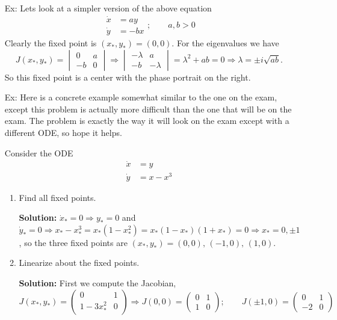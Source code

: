 \documentclass[reqno]{amsart}
\theoremstyle{definition}
\begin{document}
\begin{enumerate}
\begin{figure}[htbp]
\end{figure}
%
\item[Ex:  ]  Lets look at a simpler version of the above equation
%
\begin{equation}
\begin{split}
\dot{x} &= ay\\
\dot{y} &= -bx
\end{split};\qquad a,b > 0
\end{equation}
%
Clearly the fixed point is $(x_*,y_*) = (0,0)$.  For the eigenvalues we have
%
\begin{equation*}
J(x_*,y_*) = \begin{vmatrix}
0 & a\\
-b & 0
\end{vmatrix} \Rightarrow \begin{vmatrix}
- \lambda & a\\
-b & - \lambda
\end{vmatrix} = \lambda^2 + ab = 0 \Rightarrow \lambda = \pm i\sqrt{ab}.
\end{equation*}
%
So this fixed point is a center with the phase portrait on the right.

\item[Ex:  ]  Here is a concrete example somewhat similar to the one on the exam, except
this problem is actually more difficult than the one that will be on the exam.  The problem
is exactly the way it will look on the exam except with a different ODE, so hope it helps.

Consider the ODE
%
\begin{equation}
\begin{split}
\dot{x} &= y\\
\dot{y} &= x - x^3
\end{split}
\end{equation}

\begin{enumerate}

\item  Find all fixed points.

\textbf{Solution:  }  $\dot{x}_* = 0 \Rightarrow y_* = 0$ and
$\dot{y}_* = 0 \Rightarrow x_* - x_*^3 = x_*(1 - x_*^2) = x_*(1-x_*)(1+x_*) = 0 \Rightarrow x_* = 0, \pm 1$,
so the three fixed points are $(x_*,y_*) = (0,0),\,(-1,0),\,(1,0)$.

\item  Linearize about the fixed points.

\textbf{Solution:  }  First we compute the Jacobian,
%
\begin{equation*}
J(x_*,y_*) = \begin{pmatrix}
0 & 1\\
1-3x_*^2 & 0
\end{pmatrix} \Rightarrow J(0,0) = \begin{pmatrix}
0 & 1\\
1 & 0
\end{pmatrix}; \qquad J(\pm 1,0) = \begin{pmatrix}
0 & 1\\
-2 & 0
\end{pmatrix}
\end{equation*}


\end{enumerate}
\end{enumerate}
\end{document}
